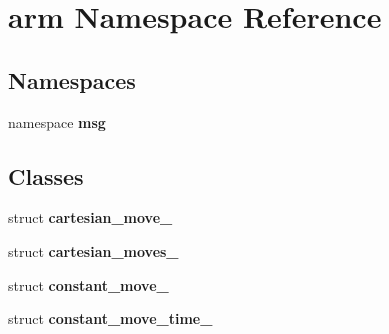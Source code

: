 \section{arm \-Namespace \-Reference}
\label{namespacearm}
\subsection*{\-Namespaces}
\begin{DoxyCompactItemize}
\item 
namespace {\bf msg}
\end{DoxyCompactItemize}
\subsection*{\-Classes}
\begin{DoxyCompactItemize}
\item 
struct {\bf cartesian\-\_\-move\-\_\-}
\item 
struct {\bf cartesian\-\_\-moves\-\_\-}
\item 
struct {\bf constant\-\_\-move\-\_\-}
\item 
struct {\bf constant\-\_\-move\-\_\-time\-\_\-}
\end{DoxyCompactItemize}
